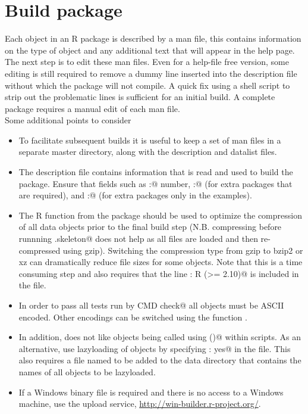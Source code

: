 \documentclass{article}
\begin{document}
\section{Build package}
Each object in an R package is described by a man file, this contains information on the type of object and any additional text that will appear in the help page. The next step is to edit these man files. Even for a help-file free version, some editing is still required to remove a dummy line inserted into the description file without which the package will not compile. A quick fix using a shell script to strip out the problematic lines is sufficient for an initial build. A complete package requires a manual edit of each man file.
\\ Some additional points to consider
\begin{itemize}
\item To facilitate subsequent builds it is useful to keep a set of man files in a separate master directory, along with the description and datalist files.
\item The description file contains information that is read and used to build the package. Ensure that fields such as \verb@Version:@ number, \verb@Depends:@ (for extra packages that are required), and \verb@Suggests:@ (for extra packages only in the examples).
\item The R function \verb@resaveRdaFiles@ from the \verb@tools@ package should be used to optimize the compression of all data objects prior to the final build step (N.B. compressing before runnning \verb@package.skeleton@ does not help as all files are loaded and then re-compressed using gzip). Switching the compression type from gzip to bzip2 or xz can dramatically reduce file sizes for some objects. Note that this is a time consuming step and also requires that the line \verb@Depends: R (>= 2.10)@ is included in the \verb@DESCRIPTION@ file.
\item In order to pass all tests run by \verb@R CMD check@ all objects must be ASCII encoded. Other encodings can be switched using the function \verb@iconv@.
\item In addition, \verb@check@ does not like objects being called using \verb@data()@ within scripts. As an alternative, use lazyloading of objects by specifying \verb@LazyData: yes@ in the \verb@DESCRIPTION@ file. This also requires a file named \verb@datalist@ to be added to the data directory that contains the names of all objects to be lazyloaded.
\item If a Windows binary file is required and there is no access to a Windows machine, use the upload service,  \url{http://win-builder.r-project.org/}.
\end{itemize}
\end{document}
